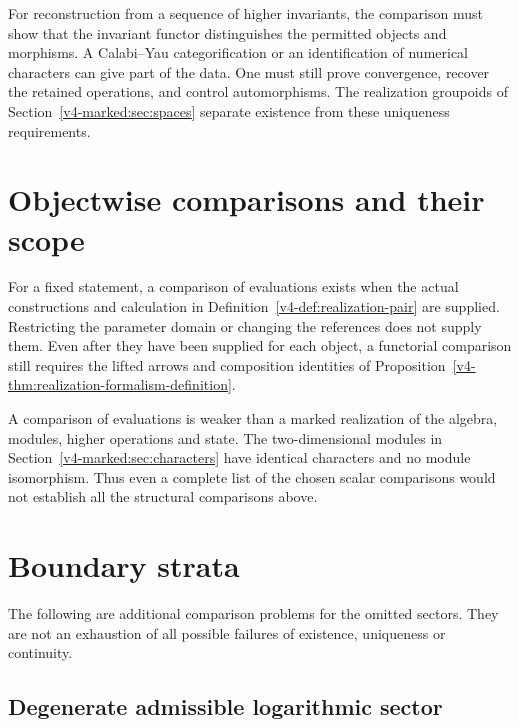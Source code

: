 For reconstruction from a sequence of higher invariants, the comparison
must show that the invariant functor distinguishes the permitted
objects and morphisms. A Calabi--Yau categorification or an identification
of numerical characters can give part of the data. One must still prove
convergence, recover the retained operations, and control automorphisms.
The realization groupoids of Section~\ref{v4-marked:sec:spaces}
separate existence from these uniqueness requirements.

\section{Objectwise comparisons and their scope}
\label{v4-sec:completeness}

\begin{remark}
\label{v4-thm:realization-completeness-programme}
For a fixed statement, a comparison of evaluations exists when the
actual constructions and calculation in
Definition~\ref{v4-def:realization-pair} are supplied. Restricting the
parameter domain or changing the references does not supply them.
Even after they have been supplied for each object, a functorial
comparison still requires the lifted arrows and composition identities
of Proposition~\ref{v4-thm:realization-formalism-definition}.
\end{remark}

\begin{remark}
\label{v4-rem:completeness-claim-form}
A comparison of evaluations is weaker than a marked realization of the
algebra, modules, higher operations and state. The two-dimensional
modules in Section~\ref{v4-marked:sec:characters} have identical
characters and no module isomorphism. Thus even a complete list of the
chosen scalar comparisons would not establish all the structural
comparisons above.
\end{remark}

\section{Boundary strata}
\label{v4-sec:domain-restrictions}

The following are additional comparison problems for the omitted
sectors. They are not an exhaustion of all possible failures of
existence, uniqueness or continuity.

\subsection{Degenerate admissible logarithmic sector}
\label{v4-sec:ckl-sector}


